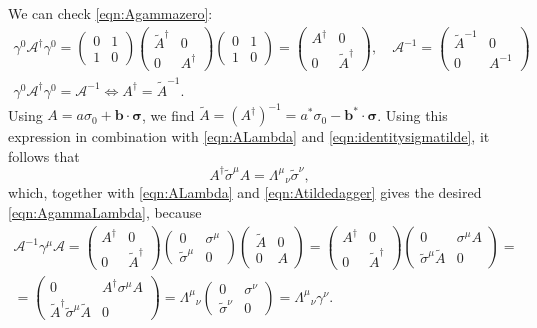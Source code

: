 \documentclass[a4paper,12pt]{book}
\renewcommand{\vec}{\mathbf}
\theoremstyle{definition}
\theoremstyle{remark}
\begin{document}
We can check \cref{eqn:Agammazero}:
\begin{gather}
\gamma^0\mathcal A^\dagger\gamma^0=
\begin{pmatrix}0&1\\ 1&0\end{pmatrix}
\begin{pmatrix}\tilde A^\dagger&0\\ 0&A^\dagger\end{pmatrix}
\begin{pmatrix}0&1\\ 1&0\end{pmatrix}=
\begin{pmatrix} A^\dagger&0\\ 0&\tilde A^\dagger\end{pmatrix},
\quad\mathcal A^{-1}=\begin{pmatrix}\tilde A^{-1}&0\\ 0&A^{-1}\end{pmatrix}\nonumber\\
\gamma^0\mathcal A^\dagger\gamma^0=\mathcal A^{-1}\iff A^\dagger=\tilde A^{-1}.
\label{eqn:Atildedagger}
\end{gather}
Using $A=a\sigma_0+\vec b\cdot\boldsymbol\sigma$, we find $\tilde A=(A^\dagger)^{-1}=a^*\sigma_0-\vec b^*\cdot\boldsymbol\sigma$. Using this expression in combination with \cref{eqn:ALambda} and \cref{eqn:identitysigmatilde}, it follows that
\[A^\dagger\tilde\sigma^\mu A=\Lambda^\mu{}_\nu\tilde\sigma^\nu,\]
which, together with \cref{eqn:ALambda} and \cref{eqn:Atildedagger} gives the desired \cref{eqn:AgammaLambda}, because
\begin{multline*}
\mathcal A^{-1}\gamma^\mu\mathcal A=
\begin{pmatrix}A^\dagger&0\\ 0&\tilde A^\dagger\end{pmatrix}
\begin{pmatrix}0&\sigma^\mu\\ \tilde\sigma^\mu&0\end{pmatrix}
\begin{pmatrix}\tilde A&0\\ 0&A\end{pmatrix}=
\begin{pmatrix}A^\dagger&0\\ 0&\tilde A^\dagger\end{pmatrix}
\begin{pmatrix}0&\sigma^\mu A\\ \tilde\sigma^\mu \tilde A&0\end{pmatrix}=\\
=\begin{pmatrix}0&A^\dagger\sigma^\mu A\\ \tilde A^\dagger\tilde\sigma^\mu\tilde A&0\end{pmatrix}=
\Lambda^\mu{}_\nu\begin{pmatrix}0&\sigma^\nu\\ \tilde\sigma^\nu&0\end{pmatrix}=\Lambda^\mu{}_\nu\gamma^\nu.
\end{multline*}
\end{document}
